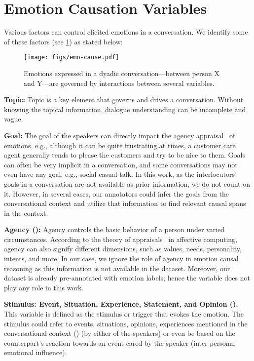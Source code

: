 \documentclass[11pt,a4paper]{article}
\theoremstyle{definition}
\begin{document}



\appendix


\section{Emotion Causation Variables} \label{sec:controlling_vars_appendix}

Various factors can control elicited emotions in a conversation. We identify some of these factors (see \cref{fig:controlling_vars}) as stated below:

\begin{figure}[ht]
	\centering
	\texttt{[image: figs/emo-cause.pdf]}
	\caption{Emotions expressed in a dyadic conversation---between person X and Y---are governed by interactions between several variables.}
	\label{fig:controlling_vars}
\end{figure}

\textbf{Topic:} Topic is a key element that governs and drives a conversation. Without knowing the topical information, dialogue understanding can be incomplete and vague.

\textbf{Goal:} The goal of the speakers can directly impact the agency appraisal~\cite{ellsworth2003appraisal} of emotions, e.g., although it can be quite frustrating at times, a customer care agent generally tends to please the customers and try to be nice to them. Goals can often be very implicit in a conversation, and some conversations may not even have any goal, e.g., social casual talk. In this work, as the interlocutors' goals in a conversation are not available as prior information, we do not count on it. However, in several cases, our annotators could infer the goals from the conversational context and utilize that information to find relevant causal spans in the context.

\textbf{Agency ():} Agency controls the basic behavior of a person under varied circumstances. According to the theory of appraisals~\citep{ellsworth2003appraisal} in affective computing, agency can also signify different dimensions, such as values, needs, personality, intents, and more. In our case, we ignore the role of agency in emotion causal reasoning as this information is not available in the dataset. Moreover, our dataset is already pre-annotated with emotion labels; hence the variable  does not play any role in this work.



\textbf{Stimulus: Event, Situation, Experience, Statement, and Opinion ().} This variable is defined as the stimulus or trigger that evokes the emotion. The stimulus could refer to events, situations, opinions, experiences mentioned in the conversational context () (by either of the speakers) or even be based on the counterpart's reaction towards an event cared by the speaker (inter-personal emotional influence). 
\end{document}
